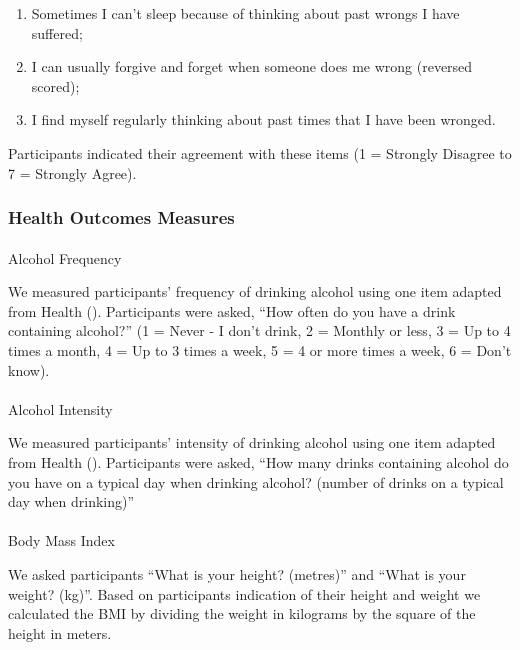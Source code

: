 \documentclass[
  single column]{article}
\makeatletter
\let\oldparagraph\paragraph
\renewcommand{\paragraph}{
    \@ifstar
      \xxxParagraphStar
      \xxxParagraphNoStar
  }
\newcommand{\xxxParagraphStar}[1]{\oldparagraph*{#1}\mbox{}}
\newcommand{\xxxParagraphNoStar}[1]{\oldparagraph{#1}\mbox{}}
\providecommand{\tightlist}{%
  \setlength{\itemsep}{0pt}\setlength{\parskip}{0pt}}\usepackage{longtable,booktabs,array}
\makeatother
\begin{document}
\begin{enumerate}
\def\labelenumi{(\arabic{enumi})}
\tightlist
\item
  Sometimes I can't sleep because of thinking about past wrongs I have
  suffered;
\item
  I can usually forgive and forget when someone does me wrong (reversed
  scored);
\item
  I find myself regularly thinking about past times that I have been
  wronged.
\end{enumerate}

Participants indicated their agreement with these items (1 = Strongly
Disagree to 7 = Strongly Agree).

\subsubsection{Health Outcomes Measures}\label{health-outcomes-measures}

\paragraph{Alcohol Frequency}\label{alcohol-frequency}

We measured participants' frequency of drinking alcohol using one item
adapted from Health ().
Participants were asked, ``How often do you have a drink containing
alcohol?'' (1 = Never - I don't drink, 2 = Monthly or less, 3 = Up to 4
times a month, 4 = Up to 3 times a week, 5 = 4 or more times a week, 6 =
Don't know).

\paragraph{Alcohol Intensity}\label{alcohol-intensity}

We measured participants' intensity of drinking alcohol using one item
adapted from Health ().
Participants were asked, ``How many drinks containing alcohol do you
have on a typical day when drinking alcohol? (number of drinks on a
typical day when drinking)''

\paragraph{Body Mass Index}\label{body-mass-index}

We asked participants ``What is your height? (metres)'' and ``What is
your weight? (kg)''. Based on participants indication of their height
and weight we calculated the BMI by dividing the weight in kilograms by
the square of the height in meters.
\end{document}
